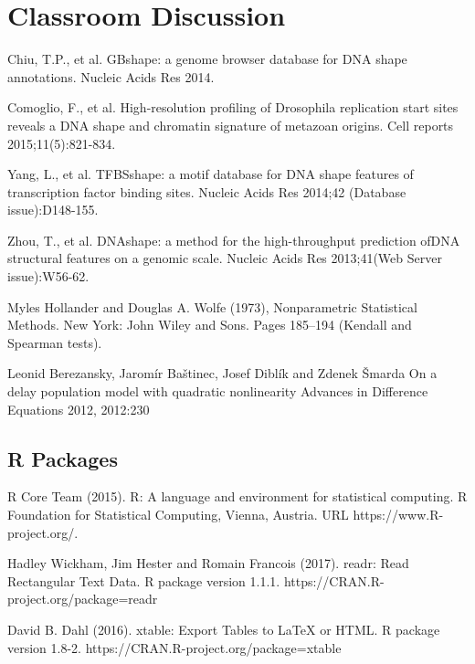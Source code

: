 \documentclass[preprint, 8pt]{elsarticle}
\theoremstyle{definition}
\begin{document}
\section{Classroom Discussion}


\begin{thebibliography}{00}
\footnotesize	

Chiu, T.P., et al. 
GBshape: a genome browser database for DNA shape annotations. 
Nucleic Acids Res 2014.
	
Comoglio, F., et al. 
\newblock High-resolution profiling of Drosophila replication start sites reveals a DNA shape and chromatin signature of metazoan origins. 
\newblock Cell reports 2015;11(5):821-834.
	
Yang, L., et al. 
\newblock TFBSshape: a motif database for DNA shape features of transcription factor binding sites. 
\newblock Nucleic Acids Res 2014;42 (Database issue):D148-155.
	
Zhou, T., et al. 
\newblock DNAshape: a method for the high-throughput prediction ofDNA structural features on a genomic scale. 
\newblock Nucleic Acids Res 2013;41(Web Server issue):W56-62.

Myles Hollander and Douglas A. Wolfe (1973), 
\newblock Nonparametric Statistical Methods. 
\newblock New York: John Wiley and Sons. Pages 185–194 (Kendall and Spearman tests).

 Leonid Berezansky, Jaromír Baštinec, Josef Diblík and Zdenek Šmarda
\newblock On a delay population model with quadratic nonlinearity 
\newblock Advances in Difference Equations 2012, 2012:230

\subsection{R Packages}

R Core Team (2015). 
\newblock R: A language and environment for statistical computing. R Foundation for Statistical Computing, Vienna, Austria.
\newblock URL https://www.R-project.org/.

 Hadley Wickham, Jim Hester and Romain Francois (2017). readr: Read
\newblock Rectangular Text Data. R package version 1.1.1.
\newblock https://CRAN.R-project.org/package=readr

 David B. Dahl (2016). 
\newblock xtable: Export Tables to LaTeX or HTML. R package version 1.8-2.
\newblock https://CRAN.R-project.org/package=xtable


\end{thebibliography}
\end{document}
